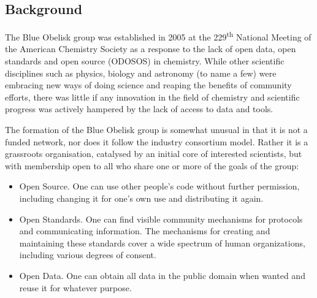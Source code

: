 \documentclass[10pt]{bmc_article}
\newenvironment{bmcformat}{\begin{raggedright}\baselineskip20pt\sloppy\setboolean{publ}{false}}{\end{raggedright}\baselineskip20pt\sloppy}
\begin{document}
\begin{bmcformat}




\section*{Background}
The Blue Obelisk group was established in 2005 at the
229\textsuperscript{th} National Meeting of the American Chemistry
Society as a response to the lack of open data, open standards and
open source (ODOSOS) in chemistry. While other scientific disciplines
such as physics, biology and astronomy (to name a few) were embracing
new ways of doing science and reaping the benefits of community
efforts, there was little if any innovation in the field of chemistry
and scientific progress was actively hampered by the lack of access to
data and tools.

The formation of the Blue Obelisk group is somewhat unusual in that it
is not a funded network, nor does it follow the industry consortium
model. Rather it is a grassroots organisation, catalysed by an initial
core of interested scientists, but with membership open to all who
share one or more of the goals of the group:
\begin{itemize}
\item Open Source. One can use other people's code without further permission, including changing it for one's own use and distributing it again.
\item Open Standards. One can find visible community mechanisms for protocols and communicating information. The mechanisms for creating and maintaining these standards cover a wide spectrum of human organizations, including various degrees of consent.
\item Open Data. One can obtain all data in the public domain when wanted and reuse it for whatever purpose.
\end{itemize}


\end{bmcformat}
\end{document}

